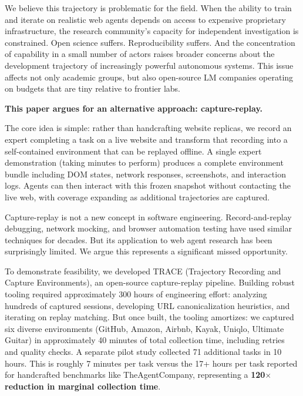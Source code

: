 \documentclass[letterpaper]{article}
\begin{document}
We believe this trajectory is problematic for the field. When the ability to train and iterate on realistic web agents depends on access to expensive proprietary infrastructure, the research community's capacity for independent investigation is constrained. Open science suffers. Reproducibility suffers. And the concentration of capability in a small number of actors raises broader concerns about the development trajectory of increasingly powerful autonomous systems. This issue affects not only academic groups, but also open-source LM companies operating on budgets that are tiny relative to frontier labs.

\textbf{This paper argues for an alternative approach: capture-replay.}

The core idea is simple: rather than handcrafting website replicas, we record an expert completing a task on a live website and transform that recording into a self-contained environment that can be replayed offline. A single expert demonstration (taking minutes to perform) produces a complete environment bundle including DOM states, network responses, screenshots, and interaction logs. Agents can then interact with this frozen snapshot without contacting the live web, with coverage expanding as additional trajectories are captured.

Capture-replay is not a new concept in software engineering. Record-and-replay debugging, network mocking, and browser automation testing have used similar techniques for decades. But its application to web agent research has been surprisingly limited. We argue this represents a significant missed opportunity.

To demonstrate feasibility, we developed TRACE (Trajectory Recording and Capture Environments), an open-source capture-replay pipeline. Building robust tooling required approximately 300 hours of engineering effort: analyzing hundreds of captured sessions, developing URL canonicalization heuristics, and iterating on replay matching. But once built, the tooling amortizes: we captured six diverse environments (GitHub, Amazon, Airbnb, Kayak, Uniqlo, Ultimate Guitar) in approximately 40 minutes of total collection time, including retries and quality checks. A separate pilot study collected 71 additional tasks in 10 hours. This is roughly 7 minutes per task versus the 17+ hours per task reported for handcrafted benchmarks like TheAgentCompany, representing a \textbf{120$\times$ reduction in marginal collection time}.
\end{document}
